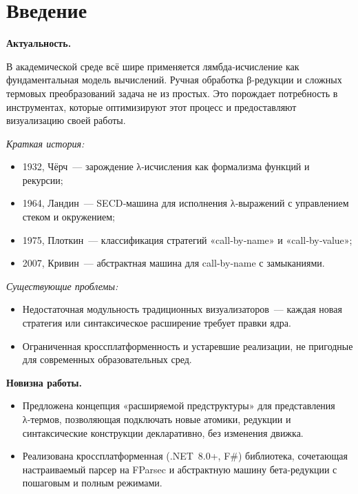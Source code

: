 \chapter*{Введение}
\label{sec:afterwords}

\textbf{Актуальность.}


	В академической среде всё шире применяется лямбда‑исчисление как фундаментальная модель вычислений. Ручная обработка β‑редукции и сложных термовых преобразований задача не из простых. Это порождает потребность в инструментах, которые оптимизируют этот процесс и предоставляют визуализацию своей работы.


	\emph{Краткая история:}
        \begin{itemize}
          \item 1932, Чёрч — зарождение λ‑исчисления как формализма функций и рекурсии;
          \item 1964, Ландин — SECD‑машина для исполнения λ‑выражений с управлением стеком и окружением;
          \item 1975, Плоткин — классификация стратегий «call‑by‑name» и «call‑by‑value»;
          \item 2007, Кривин — абстрактная машина для call‑by‑name с замыканиями.
        \end{itemize}


	\emph{Существующие проблемы:}  
        \begin{itemize}
          \item Недостаточная модульность традиционных визуализаторов — каждая новая стратегия или синтаксическое расширение требует правки ядра.  
          \item Ограниченная кроссплатформенность и устаревшие реализации, не пригодные для современных образовательных сред.
        \end{itemize}

\textbf{Новизна работы.}  
    \begin{itemize}
      \item Предложена концепция «расширяемой предструктуры» для представления λ‑термов, позволяющая подключать новые атомики, редукции и синтаксические конструкции декларативно, без изменения движка.  
      \item Реализована кроссплатформенная (.NET 8.0+, F\#) библиотека, сочетающая настраиваемый парсер на FParsec и абстрактную машину бета‑редукции с пошаговым и полным режимами.
    \end{itemize}

